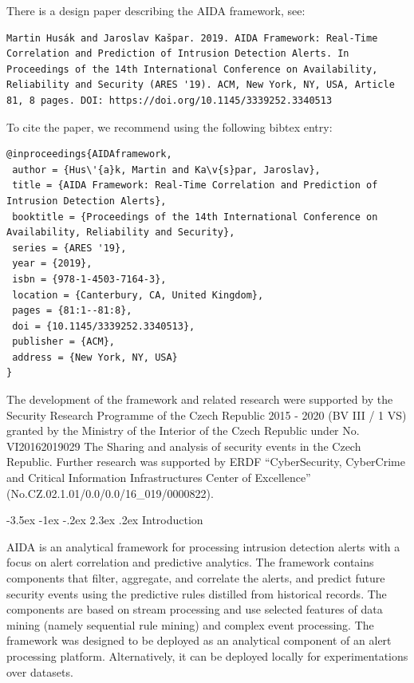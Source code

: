 \documentclass[a4paper]{article} %
\makeatletter
\renewcommand\section{\@startsection {section}{1}{\z@}%
                   {-3.5ex \@plus -1ex \@minus -.2ex}%
                   {2.3ex \@plus.2ex}%
                   {\normalfont\sffamily\Large\bfseries\color{projectcolor}}}
\makeatother
\begin{document}

There is a design paper describing the AIDA framework, see:
\begin{lstlisting}[]
Martin Husák and Jaroslav Kašpar. 2019. AIDA Framework: Real-Time Correlation and Prediction of Intrusion Detection Alerts. In Proceedings of the 14th International Conference on Availability, Reliability and Security (ARES '19). ACM, New York, NY, USA, Article 81, 8 pages. DOI: https://doi.org/10.1145/3339252.3340513
\end{lstlisting}

To cite the paper, we recommend using the following bibtex entry:
\begin{lstlisting}[]
@inproceedings{AIDAframework,
 author = {Hus\'{a}k, Martin and Ka\v{s}par, Jaroslav},
 title = {AIDA Framework: Real-Time Correlation and Prediction of Intrusion Detection Alerts},
 booktitle = {Proceedings of the 14th International Conference on Availability, Reliability and Security},
 series = {ARES '19},
 year = {2019},
 isbn = {978-1-4503-7164-3},
 location = {Canterbury, CA, United Kingdom},
 pages = {81:1--81:8},
 doi = {10.1145/3339252.3340513},
 publisher = {ACM},
 address = {New York, NY, USA}
}
\end{lstlisting}

The development of the framework and related research were supported by the Security Research Programme of the Czech Republic 2015 - 2020 (BV III / 1 VS) granted by the Ministry of the Interior of the Czech Republic under No. VI20162019029 The Sharing and analysis of security events in the Czech Republic. 
Further research was supported by ERDF ``CyberSecurity, CyberCrime and Critical Information Infrastructures Center of Excellence'' (No.CZ.02.1.01/0.0/0.0/16\_019/0000822).

\cleardoublepage

\section{Introduction}

AIDA is an analytical framework for processing intrusion detection alerts with a focus on alert correlation and predictive analytics. The framework contains components that filter, aggregate, and correlate the alerts, and predict future security events using the predictive rules distilled from historical records. The components are based on stream processing and use selected features of data mining (namely sequential rule mining) and complex event processing. The framework was designed to be deployed as an analytical component of an alert processing platform. Alternatively, it can be deployed locally for experimentations over datasets.
\end{document}
